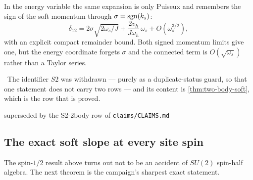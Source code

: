 \begin{remark}
\label{rem:puiseux}
In the energy variable the same expansion is only Puiseux and remembers the
sign of the soft momentum through $\sigma=\operatorname{sgn}(k_s)$:
\begin{equation}
  \delta_{12}=2\sigma\sqrt{2\omega_s/J}
    +\frac{2v_h}{J\omega_h}\,\omega_s+O(\omega_s^{3/2}),
\end{equation}
with an explicit compact remainder bound. Both signed momentum limits give one,
but the energy coordinate forgets $\sigma$ and the connected term is
$O(\sqrt{\omega_s})$ rather than a Taylor series.
\end{remark}

\begin{refutedclaim}
\label{ref:s2-label}
\statusRefuted\ The identifier $S2$ was withdrawn --- purely as a
duplicate-status guard, so that one statement does not carry two rows --- and
its content is \cref{thm:two-body-soft}, which is the row that is proved.
\end{refutedclaim}
%
{superseded by the S2-2body row of \texttt{claims/CLAIMS.md}}

\subsection{The exact soft slope at every site spin}

The spin-$1/2$ result above turns out not to be an accident of $SU(2)$
spin-half algebra. The next theorem is the campaign's sharpest exact
statement.

